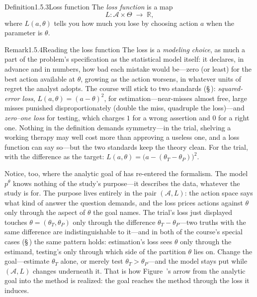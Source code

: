 \documentclass[main.tex]{subfiles}
\begin{document}
\begin{Obj}{Definition}{1.5.3}{Loss function}
The \emph{loss function} is a map
\[ L : \mathcal{A}\times\Theta \;\to\; \mathbb{R}, \]
where $L(a,\theta)$ tells you how much you lose by choosing action $a$ when the parameter is
$\theta$.
\end{Obj}

\begin{ObjL}{Remark}{1.5.4}{Reading the loss function}
The loss is a \emph{modeling choice}, as much a part of the problem's specification as the
statistical model itself: it declares, in advance and in numbers, how bad each mistake would
be---zero (or least) for the best action available at $\theta$, growing as the action worsens,
in whatever units of regret the analyst adopts. The course will stick to two standards
(\S\,): \emph{squared-error loss}, $L(a,\theta)=(a-\theta)^2$, for
estimation---near-misses almost free, large misses punished disproportionately (double the
miss, quadruple the loss)---and \emph{zero--one loss} for testing, which charges $1$ for a
wrong assertion and $0$ for a right one. Nothing in the definition demands symmetry---in the
trial, shelving a working therapy may well cost more than approving a useless one, and a loss
function can say so---but the two standards keep the theory clean. For the trial, with the
difference as the target: $L(a,\theta)=\big(a-(\theta_T-\theta_P)\big)^2$.
\end{ObjL}

\medskip
Notice, too, where the analytic goal of  has re-entered the formalism. The model
$p^{\theta}$ knows nothing of the study's purpose---it describes the data, whatever the study
is for. The purpose lives entirely in the pair $(\mathcal{A},L)$: the action space says what
kind of answer the question demands, and the loss prices actions against $\theta$ only through
the aspect of $\theta$ the goal names. The trial's loss just displayed touches
$\theta=(\theta_T,\theta_P)$ only through the difference $\theta_T-\theta_P$---two truths with
the same difference are indistinguishable to it---and in both of the course's special cases
(\S\,) the same pattern holds: estimation's loss sees $\theta$ only through the
estimand, testing's only through which side of the partition $\theta$ lies on. Change the
goal---estimate $\theta_T$ alone, or merely test $\theta_T>\theta_P$---and the model stays
put while $(\mathcal{A},L)$ changes underneath it. That is how Figure~'s arrow
from the analytic goal into the method is realized: the goal reaches the method through the
loss it induces.
\end{document}
